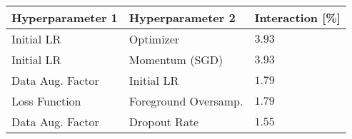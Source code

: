 \begin{tabular}{lll}
\toprule
Hyperparameter 1 & Hyperparameter 2 & Interaction [\%] \\
\midrule
Initial LR & Optimizer & $3.93$ \\
Initial LR & Momentum (SGD) & $3.93$ \\
Data Aug. Factor & Initial LR & $1.79$ \\
Loss Function & Foreground Oversamp. & $1.79$ \\
Data Aug. Factor & Dropout Rate & $1.55$ \\
\bottomrule
\end{tabular}
